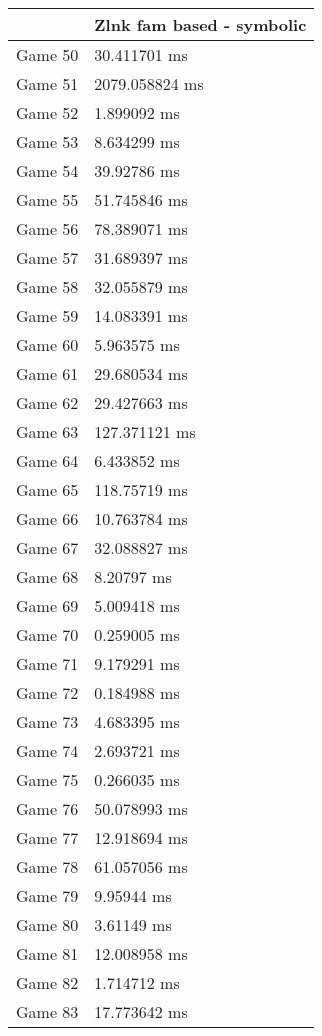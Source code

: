 \begin{tabular}{|l|l|}
	\hline
	& Zlnk fam based - symbolic \\ \hline
	Game 50 & 30.411701 ms \\ \hline
	Game 51 & 2079.058824 ms \\ \hline
	Game 52 & 1.899092 ms \\ \hline
	Game 53 & 8.634299 ms \\ \hline
	Game 54 & 39.92786 ms \\ \hline
	Game 55 & 51.745846 ms \\ \hline
	Game 56 & 78.389071 ms \\ \hline
	Game 57 & 31.689397 ms \\ \hline
	Game 58 & 32.055879 ms \\ \hline
	Game 59 & 14.083391 ms \\ \hline
	Game 60 & 5.963575 ms \\ \hline
	Game 61 & 29.680534 ms \\ \hline
	Game 62 & 29.427663 ms \\ \hline
	Game 63 & 127.371121 ms \\ \hline
	Game 64 & 6.433852 ms \\ \hline
	Game 65 & 118.75719 ms \\ \hline
	Game 66 & 10.763784 ms \\ \hline
	Game 67 & 32.088827 ms \\ \hline
	Game 68 & 8.20797 ms \\ \hline
	Game 69 & 5.009418 ms \\ \hline
	Game 70 & 0.259005 ms \\ \hline
	Game 71 & 9.179291 ms \\ \hline
	Game 72 & 0.184988 ms \\ \hline
	Game 73 & 4.683395 ms \\ \hline
	Game 74 & 2.693721 ms \\ \hline
	Game 75 & 0.266035 ms \\ \hline
	Game 76 & 50.078993 ms \\ \hline
	Game 77 & 12.918694 ms \\ \hline
	Game 78 & 61.057056 ms \\ \hline
	Game 79 & 9.95944 ms \\ \hline
	Game 80 & 3.61149 ms \\ \hline
	Game 81 & 12.008958 ms \\ \hline
	Game 82 & 1.714712 ms \\ \hline
	Game 83 & 17.773642 ms \\ \hline

\end{tabular}
